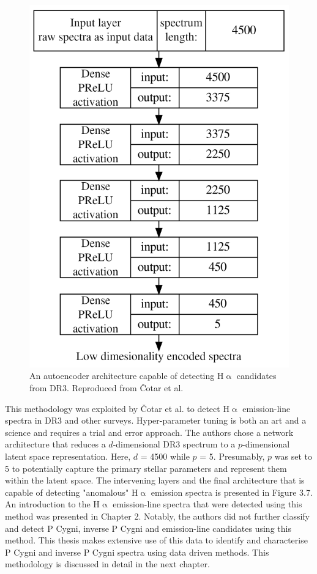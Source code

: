 \begin{figure}[!htb]
\centering
\includegraphics[scale=0.45]{figures/autoencoder.png}
\caption{An autoencoder architecture capable of detecting H$\upalpha$ candidates from DR3. Reproduced from Čotar et al.\cite{vcotar2021galah}}
\end{figure}

This methodology was exploited by Čotar et al. to detect H$\upalpha$ emission-line spectra in DR3 and other surveys\cite{vcotar2021galah}. Hyper-parameter tuning is both an art and a science and requires a trial and error approach. The authors chose a network architecture that reduces a $d$-dimensional DR3 spectrum to a $p$-dimensional latent space representation. Here, $d$ = 4500 while $p$ = 5. Presumably, $p$ was set to 5 to potentially capture the primary stellar parameters and represent them within the latent space. The intervening layers and the final architecture that is capable of detecting "anomalous" H$\upalpha$ emission spectra is presented in Figure 3.7. An introduction to the H$\upalpha$ emission-line spectra that were detected using this method was presented in Chapter 2. Notably, the authors did not further classify and detect P Cygni, inverse P Cygni and emission-line candidates using this method. This thesis makes extensive use of this data to identify and characterise P Cygni and inverse P Cygni spectra using data driven methods. This methodology is discussed in detail in the next chapter. 

